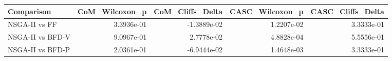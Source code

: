\begin{tabular}{lrrrr}
\toprule
Comparison & CoM_Wilcoxon_p & CoM_Cliffs_Delta & CASC_Wilcoxon_p & CASC_Cliffs_Delta \\
\midrule
NSGA-II vs FF & 3.3936e-01 & -1.3889e-02 & 1.2207e-02 & 3.3333e-01 \\
NSGA-II vs BFD-V & 9.0967e-01 & 2.7778e-02 & 4.8828e-04 & 5.5556e-01 \\
NSGA-II vs BFD-P & 2.0361e-01 & -6.9444e-02 & 1.4648e-03 & 3.3333e-01 \\
\bottomrule
\end{tabular}
